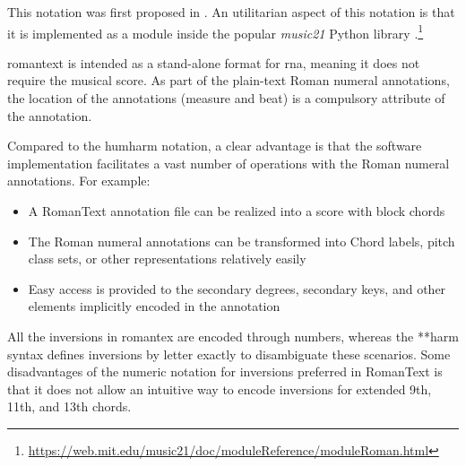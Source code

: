 

This notation was first proposed in
\textcite{gotham2019romantext}. An utilitarian aspect of
this notation is that it is implemented as a module inside
the popular \emph{music21} Python library
\parencite{cuthbert2010music21}.\footnote{\href{https://web.mit.edu/music21/doc/moduleReference/moduleRoman.html}{https://web.mit.edu/music21/doc/moduleReference/moduleRoman.html}}


\gls{romantext} is intended as a stand-alone format for
\gls{rna}, meaning it does not require the musical score. As
part of the plain-text Roman numeral annotations, the
location of the annotations (measure and beat) is a
compulsory attribute of the annotation.

Compared to the \gls{humharm} notation, a clear advantage is
that the software implementation facilitates a vast number
of operations with the Roman numeral annotations. For
example:

\begin{itemize}
    \item A RomanText annotation file can be realized into a
    score with block chords
    \item The Roman numeral annotations can be transformed
    into Chord labels, pitch class sets, or other
    representations relatively easily
    \item Easy access is provided to the secondary degrees,
    secondary keys, and other elements implicitly encoded in
    the annotation
\end{itemize}

All the inversions in \gls{romantex} are encoded through
numbers, whereas the **harm syntax defines inversions by
letter exactly to disambiguate these scenarios. Some
disadvantages of the numeric notation for inversions
preferred in RomanText is that it does not allow an
intuitive way to encode inversions for extended 9th, 11th,
and 13th chords. 
